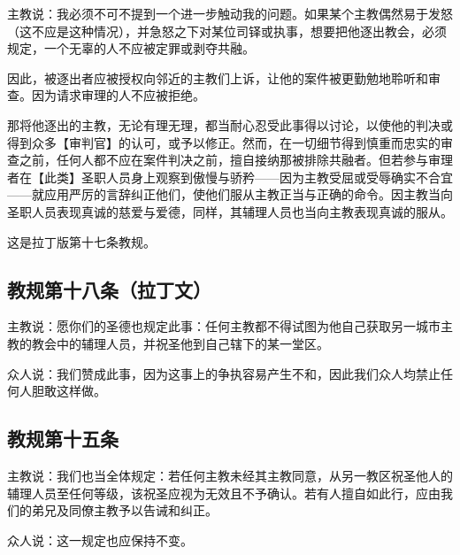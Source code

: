 主教说：我必须不可不提到一个进一步触动我的问题。如果某个主教偶然易于发怒（这不应是这种情况），并急怒之下对某位司铎或执事，想要把他逐出教会，必须规定，一个无辜的人不应被定罪或剥夺共融。\par

因此，被逐出者应被授权向邻近的主教们上诉，让他的案件被更勤勉地聆听和审查。因为请求审理的人不应被拒绝。\par

那将他逐出的主教，无论有理无理，都当耐心忍受此事得以讨论，以使他的判决或得到众多【审判官】的认可，或予以修正。然而，在一切细节得到慎重而忠实的审查之前，任何人都不应在案件判决之前，擅自接纳那被排除共融者。但若参与审理者在【此类】圣职人员身上观察到傲慢与骄矜——因为主教受屈或受辱确实不合宜——就应用严厉的言辞纠正他们，使他们服从主教正当与正确的命令。因主教当向圣职人员表现真诚的慈爱与爱德，同样，其辅理人员也当向主教表现真诚的服从。\par

这是拉丁版第十七条教规。\par


\subsection{教规第十八条（拉丁文）}

主教说：愿你们的圣德也规定此事：任何主教都不得试图为他自己获取另一城市主教的教会中的辅理人员，并祝圣他到自己辖下的某一堂区。\par

众人说：我们赞成此事，因为这事上的争执容易产生不和，因此我们众人均禁止任何人胆敢这样做。\par


\subsection{教规第十五条}

主教说：我们也当全体规定：若任何主教未经其主教同意，从另一教区祝圣他人的辅理人员至任何等级，该祝圣应视为无效且不予确认。若有人擅自如此行，应由我们的弟兄及同僚主教予以告诫和纠正。\par

众人说：这一规定也应保持不变。\par

